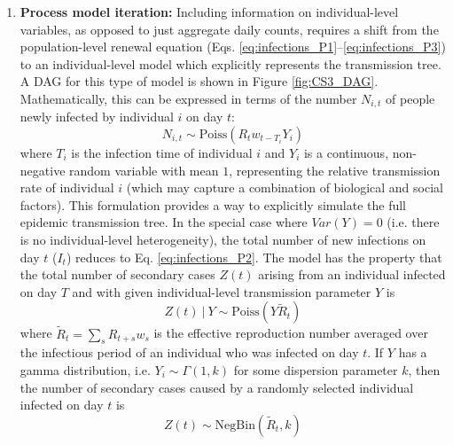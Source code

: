 \documentclass{article}
\begin{document}
\begin{enumerate}
    \item \textbf{Process model iteration:} Including information on individual-level variables, as opposed to just aggregate daily counts, requires a shift from the population-level renewal equation (Eqs. \eqref{eq:infections_P1}--\eqref{eq:infections_P3}) to an individual-level model which explicitly represents the transmission tree. A DAG for this type of model is shown in Figure \ref{fig:CS3_DAG}. Mathematically, this can be expressed in terms of the number $N_{i,t}$ of people newly infected by individual $i$ on day $t$:
    \begin{equation} \label{eq:individual_level}
    N_{i,t} \sim \mathrm{Poiss} \left( R_t w_{t-T_i} Y_i\right)
    \end{equation}
    where $T_i$ is the infection time of individual $i$ and $Y_i$ is a continuous, non-negative random variable with mean $1$, representing the relative transmission rate of individual $i$ (which may capture a combination of biological and social factors). This formulation provides a way to explicitly simulate the full epidemic transmission tree.  In the special case where $Var(Y)=0$ (i.e. there is no individual-level heterogeneity), the total number of new infections on day $t$ ($I_t$) reduces to Eq. \eqref{eq:infections_P2}. The model has the property that the total number of secondary cases $Z(t)$ arising from an individual infected on day $T$ and with given individual-level transmission parameter $Y$ is
    \begin{equation}
       Z(t) \ | \ Y \sim \mathrm{Poiss}\left( Y \tilde{R}_t\right)
    \end{equation}
    where $\tilde{R}_t= \sum_s R_{t+s} w_s$ is the effective reproduction number averaged over the infectious period of an individual who was infected on day $t$. If $Y$ has a gamma distribution, i.e. $Y_i\sim \Gamma(1,k)$ for some dispersion parameter $k$, then the number of secondary cases caused by a randomly selected individual infected on day $t$ is
     \begin{equation} \label{eq:offspring_dist}
        Z(t) \sim \mathrm{NegBin}\left( \tilde{R}_t, k\right)
    \end{equation}   


\end{enumerate}
\end{document}
